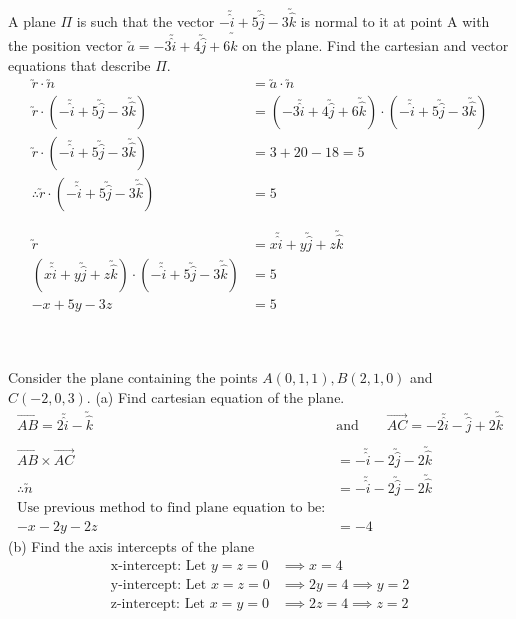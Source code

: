 \documentclass[a4paper,twoside]{article}
\newenvironment{example}[1]{%
	\mbox{}\\\tcolorbox[beamer,breakable,%
		title=Example: #1,standard jigsaw,opacityback=0, colframe=blue!75!black]}{\endtcolorbox\mbox{}\\}
\begin{document}
			\begin{example}{Equation of a Plane given Point and Normal Vector}
				A plane $\Pi$ is such that the vector $-\utilde{\hat{i}}+5\utilde{\hat{j}}-3\utilde{\hat{k}}$ is normal to it at point A with the position vector $\utilde{a}=-3\utilde{\hat{i}}+4\utilde{\hat{j}}+6\utilde{\hat{k}}$ on the plane. Find the cartesian and vector equations that describe $\Pi$.\\
				\begin{align*}
					\utilde{r}\cdot\utilde{n}&=\utilde{a}\cdot\utilde{n} \\
					\utilde{r}\cdot\left(-\utilde{\hat{i}}+5\utilde{\hat{j}}-3\utilde{\hat{k}}\right)&=\left(-3\utilde{\hat{i}}+4\utilde{\hat{j}}+6\utilde{\hat{k}}\right)\cdot\left(-\utilde{\hat{i}}+5\utilde{\hat{j}}-3\utilde{\hat{k}}\right) \\
					\utilde{r}\cdot\left(-\utilde{\hat{i}}+5\utilde{\hat{j}}-3\utilde{\hat{k}}\right)&=3+20-18=5 \\
					\therefore\utilde{r}\cdot\left(-\utilde{\hat{i}}+5\utilde{\hat{j}}-3\utilde{\hat{k}}\right)&=5\\
					\\
					\\
					\utilde{r}&=x\utilde{\hat{i}}+y\utilde{\hat{j}}+z\utilde{\hat{k}} \\
					\left(x\utilde{\hat{i}}+y\utilde{\hat{j}}+z\utilde{\hat{k}}\right)\cdot\left(-\utilde{\hat{i}}+5\utilde{\hat{j}}-3\utilde{\hat{k}}\right)&=5 \\
					-x+5y-3z&=5
				\end{align*}
			\end{example}
			
			\begin{example}{Equation of Plane Given 3 Points}
				Consider the plane containing the points $A(0,1,1),B(2,1,0)$ and $C(-2,0,3)$.
				(a) Find cartesian equation of the plane.
				\begin{align*}
					\overrightarrow{AB}=2\utilde{\hat{i}}-\utilde{\hat{k}} \qquad &\text{and} \qquad \overrightarrow{AC}=-2\utilde{\hat{i}}-\utilde{\hat{j}}+2\utilde{\hat{k}} \\
					\\
					\overrightarrow{AB}\times\overrightarrow{AC}&=-\utilde{\hat{i}}-2\utilde{\hat{j}}-2\utilde{\hat{k}} \\
					\therefore \utilde{n}&=-\utilde{\hat{i}}-2\utilde{\hat{j}}-2\utilde{\hat{k}} \\
					\text{Use previous method to find plane equation to be:}\\
					-x-2y-2z&=-4
				\end{align*}
				(b) Find the axis intercepts of the plane
				\begin{align*}
					\text{x-intercept: Let }y=z=0&\implies x=4 \\ 
					\text{y-intercept: Let }x=z=0&\implies 2y=4 \implies y=2 \\
					\text{z-intercept: Let }x=y=0&\implies 2z=4 \implies z=2
				\end{align*}
			\end{example}
			
\end{document}
